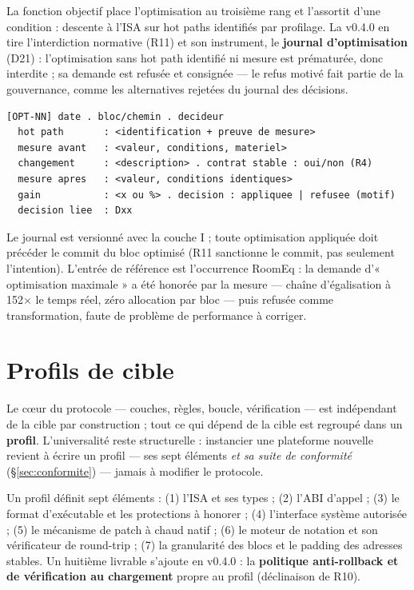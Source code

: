 La fonction objectif place l’optimisation au troisième rang et l’assortit d’une condition :
descente à l’ISA sur hot paths identifiés par profilage. La v0.4.0 en tire l’interdiction
normative (R11) et son instrument, le \textbf{journal d’optimisation} (D21) :
l’optimisation sans hot path identifié ni mesure est prématurée, donc interdite ; sa
demande est refusée et consignée — le refus motivé fait partie de la gouvernance, comme
les alternatives rejetées du journal des décisions.

\begin{lstlisting}[caption={Format normalisé d’une entrée du journal
d’optimisation.}, label={lst:opt}]
[OPT-NN] date . bloc/chemin . decideur
  hot path       : <identification + preuve de mesure>
  mesure avant   : <valeur, conditions, materiel>
  changement     : <description> . contrat stable : oui/non (R4)
  mesure apres   : <valeur, conditions identiques>
  gain           : <x ou %> . decision : appliquee | refusee (motif)
  decision liee  : Dxx
\end{lstlisting}

Le journal est versionné avec la couche I ; toute optimisation appliquée doit précéder le
commit du bloc optimisé (R11 sanctionne le commit, pas seulement l’intention). L’entrée de
référence est l’occurrence RoomEq : la demande d’« optimisation maximale » a été honorée
par la mesure — chaîne d’égalisation à 152$\times$ le temps réel, zéro allocation par
bloc — puis refusée comme transformation, faute de problème de performance à corriger.

\section{Profils de cible}\label{sec:profils}

Le cœur du protocole — couches, règles, boucle, vérification — est indépendant de la cible
par construction ; tout ce qui dépend de la cible est regroupé dans un \textbf{profil}.
L’universalité reste structurelle : instancier une plateforme nouvelle revient à écrire un
profil — ses sept éléments \emph{et sa suite de conformité} (§\ref{sec:conformite}) —
jamais à modifier le protocole.

Un profil définit sept éléments : (1) l’ISA et ses types ; (2) l’ABI d’appel ; (3) le
format d’exécutable et les protections à honorer ; (4) l’interface système autorisée ;
(5) le mécanisme de patch à chaud natif ; (6) le moteur de notation et son vérificateur
de round-trip ; (7) la granularité des blocs et le padding des adresses stables. Un
huitième livrable s’ajoute en v0.4.0 : la \textbf{politique anti-rollback et de
vérification au chargement} propre au profil (déclinaison de R10).

